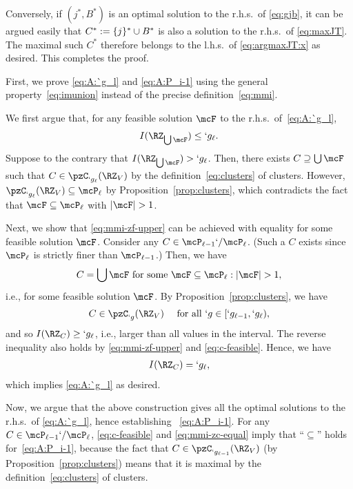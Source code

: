 \begin{Proof}
Conversely, if $(j^*,B^*)$ is an optimal solution to the r.h.s.\ of \eqref{eq:gjb}, it can be argued
easily that $C^*:=\{j\}^*\cup B^*$ is also a solution to the r.h.s.\ of \eqref{eq:maxJT}. The
maximal such $C^*$ therefore belongs to the l.h.s.\ of \eqref{eq:argmaxJT:x} as desired. This
completes the proof.
\end{Proof}


\begin{Proof}
	First, we prove \eqref{eq:A:`g_l} and \eqref{eq:A:P_i-1} using the general
	property~\eqref{eq:imunion} instead of the precise definition~\eqref{eq:mmi}. 
	
	We first argue that, for any feasible solution $\mcF$ to the r.h.s.\ of~\eqref{eq:A:`g_l}, 
	\begin{align}
		\label{eq:mmi-zf-upper}
		I(\RZ_{\bigcup\mcF}) \leq `g_\ell.
	\end{align}
	Suppose to the contrary that $I(\RZ_{\bigcup\mcF})>`g_{\ell}$. Then, there exists
	$C\supseteq\bigcup \mcF$ such that
	$C\in \pzC_{`g_\ell}(\RZ_V)$ by the definition~\eqref{eq:clusters} of clusters. However,
	$\pzC_{`g_\ell}(\RZ_V)\subseteq \mcP_{\ell}$ by Proposition~\ref{prop:clusters}, which
	contradicts the fact that $\mcF\subseteq \mcP_{\ell}$ with $\abs {\mcF}>1$. 
	
	Next, we show that \eqref{eq:mmi-zf-upper} can be achieved with equality for some feasible solution $\mcF$.
	Consider any $C\in \mcP_{\ell-1}`/\mcP_{\ell}$. (Such a $C$ exists since $\mcP_{\ell}$ is
	strictly finer than $\mcP_{\ell-1}$.) Then, we have 
	\begin{align}
	C
	= \bigcup \mcF\text{ for some }\mcF \subseteq \mcP_{\ell}:|\mcF| > 1,
	\label{eq:c-feasible}
	\end{align}
	i.e., for some feasible solution $\mcF$.
	By Proposition~\ref{prop:clusters}, we have 
	\begin{align*}
		C\in \pzC_{`g}(\RZ_V)\kern1em \text{ for all
		 }`g\in [`g_{\ell-1},`g_\ell),
	\end{align*}
	and so $I(\RZ_C)\geq `g_\ell$, i.e., larger than all values in the interval.
	The reverse inequality also holds by \eqref{eq:mmi-zf-upper} and \eqref{eq:c-feasible}. Hence, we have
	\begin{align}
		I(\RZ_C)
		=`g_\ell,
		\label{eq:mmi-zc-equal}
	\end{align}
	 which implies \eqref{eq:A:`g_l} as desired. 
	
	Now, we argue that the above construction gives all the optimal solutions to the r.h.s.\ of
	\eqref{eq:A:`g_l}, hence establishing ~\eqref{eq:A:P_i-1}. For any $C\in
	\mcP_{\ell-1}`/\mcP_{\ell}$, \eqref{eq:c-feasible} and \eqref{eq:mmi-zc-equal} imply that ``$\subseteq$'' holds
	for~\eqref{eq:A:P_i-1}, because 
	the fact that $C\in \pzC_{`g_{\ell-1}}(\RZ_V)$ (by Proposition~\ref{prop:clusters}) means that it
	is maximal by the definition~\eqref{eq:clusters} of  clusters. 
	

\end{Proof}
